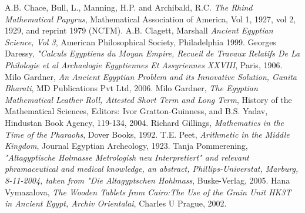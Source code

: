 \documentclass[12pt]{article}
\begin{document}
\begin{thebibliography}{9}

A.B. Chace, Bull, L., Manning, H.P. and Archibald, R.C. \emph{The Rhind Mathematical Papyrus}, Mathematical Association of America, Vol 1, 1927, vol 2, 1929, and reprint 1979 (NCTM).
A.B. Clagett, Marshall \emph{Ancient Egyptian Science, Vol 3}, American Philosophical Society, Philadelphia 1999.
 Georges Daressy, \emph{"Calculs Egyptiens du Moyan Empire, Recueil de Travaux Relatifs  De La  Philologie et al Archaelogie Egyptiennes Et Assyriennes XXVIII}, Paris, 1906.
 Milo Gardner, \emph{An Ancient Egyptian Problem and its Innovative Solution, Ganita Bharati}, MD Publications Pvt Ltd, 2006.
 Milo Gardner, \emph{The Egyptian Mathematical Leather Roll, Attested Short Term and Long Term}, History of the Mathematical Sciences, Editors: Ivor Gratton-Guinness, and B.S. Yadav, Hindustan Book Agency, 119-134, 2004.
Richard Gillings, \emph{Mathematics in the Time of the Pharaohs}, Dover Books, 1992.
 T.E. Peet, \emph{Arithmetic in the Middle Kingdom}, Journal Egyptian Archeology, 1923.
 Tanja Pommerening, \emph{"Altagyptische Holmasse Metrologish neu Interpretiert" and relevant phramaceutical and medical knowledge, an abstract,  Phillips-Universtat, Marburg, 8-11-2004, taken from "Die Altagyptschen Hohlmass}, Buske-Verlag, 2005.
 Hana Vymazalova, \emph{The Wooden Tablets from Cairo:The Use of the Grain Unit HK3T in Ancient Egypt, Archiv Orientalai}, Charles U Prague, 2002.
\end{thebibliography}



\end{document}
